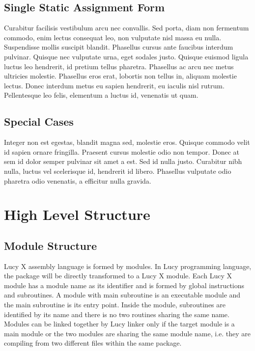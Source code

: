\subsection{Single Static Assignment Form}
Curabitur facilisis vestibulum arcu nec convallis. Sed porta, diam non fermentum commodo, enim lectus consequat leo, non vulputate nisl massa eu nulla. Suspendisse mollis suscipit blandit. Phasellus cursus ante faucibus interdum pulvinar. Quisque nec vulputate urna, eget sodales justo. Quisque euismod ligula luctus leo hendrerit, id pretium tellus pharetra. Phasellus ac arcu nec metus ultricies molestie. Phasellus eros erat, lobortis non tellus in, aliquam molestie lectus. Donec interdum metus eu sapien hendrerit, eu iaculis nisl rutrum. Pellentesque leo felis, elementum a luctus id, venenatis ut quam.

\subsection{Special Cases}
Integer non est egestas, blandit magna sed, molestie eros. Quisque commodo velit id sapien ornare fringilla. Praesent cursus molestie odio non tempor. Donec at sem id dolor semper pulvinar sit amet a est. Sed id nulla justo. Curabitur nibh nulla, luctus vel scelerisque id, hendrerit id libero. Phasellus vulputate odio pharetra odio venenatis, a efficitur nulla gravida.


\section{High Level Structure}
\subsection{Module Structure}
Lucy X assembly language is formed by modules. In Lucy programming language, the package will be directly transformed to a Lucy X module. Each Lucy X module has a module name as its identifier and is formed by global instructions and subroutines. A module with main subroutine is an executable module and the main subroutine is its entry point. Inside the module, subroutines are identified by its name and there is no two routines sharing the same name. Modules can be linked together by Lucy linker only if the target module is a main module or the two modules are sharing the same module name, i.e. they are compiling from two different files within the same package.

